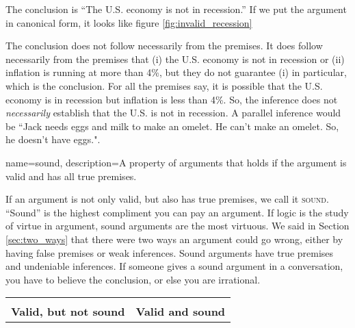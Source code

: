The conclusion is ``The U.S. economy is not in recession.'' If we put the argument in canonical form, it looks like figure \ref{fig:invalid_recession}

\begin{kormanize}
\end{kormanize}

The conclusion does not follow necessarily from the premises. It does follow necessarily from the premises that (i) the U.S. economy is not in recession or (ii) inflation is running at more than 4\%, but they do not guarantee (i) in particular, which is the conclusion. For all the premises say, it is possible that the U.S. economy is in recession but inflation is less than 4\%. So, the inference does not \textit{necessarily} establish that the U.S. is not in recession. A parallel inference would be ``Jack needs eggs and milk to make an omelet. He can't make an omelet. So, he doesn't have eggs.".

{
name=sound,
description={A property of arguments that holds if the argument is valid and has all true premises.}
}

If an argument is not only valid, but also has true premises, we call it \textsc{\gls{sound}}. \label{def:sound} ``Sound'' is the highest compliment you can pay an argument. If logic is the study of virtue in argument, sound arguments are the most virtuous. We said in Section \ref{sec:two_ways} that there were two ways an argument could go wrong, either by having false premises or weak inferences. Sound arguments have true premises and undeniable inferences. If someone gives a sound argument in a conversation, you have to believe the conclusion, or else you are irrational.

\begin{longtabu}{X[l,c]X[l,c]}
\begin{kormanize}
\end{kormanize}
&

\begin{kormanize}
\end{kormanize}
\\
\textbf{Valid, but not sound}&
\textbf{Valid and sound}
\end{longtabu}


